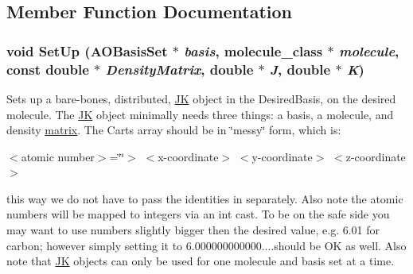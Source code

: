 \subsection{Member Function Documentation}
\hypertarget{classJKBuilder_1_1JK_a13b685265e196c183897777ec2f3136a}{
\subsubsection[{SetUp}]{\setlength{\rightskip}{0pt plus 5cm}void SetUp ({\bf AOBasisSet} $\ast$ {\em basis}, \/  {\bf molecule\_\-class} $\ast$ {\em molecule}, \/  const double $\ast$ {\em DensityMatrix}, \/  double $\ast$ {\em J}, \/  double $\ast$ {\em K})}}
\label{classJKBuilder_1_1JK_a13b685265e196c183897777ec2f3136a}


Sets up a bare-\/bones, distributed, \hyperlink{classJKBuilder_1_1JK}{JK} object in the DesiredBasis, on the desired molecule. The \hyperlink{classJKBuilder_1_1JK}{JK} object minimally needs three things: a basis, a molecule, and density \hyperlink{classJKBuilder_1_1matrix}{matrix}. The Carts array should be in \char`\"{}messy\char`\"{} form, which is:\par
 $<$atomic number$>$=\char`\"{}\char`\"{}$>$ $<$x-\/coordinate$>$ $<$y-\/coordinate$>$ $<$z-\/coordinate$>$\par
 this way we do not have to pass the identities in separately. Also note the atomic numbers will be mapped to integers via an int cast. To be on the safe side you may want to use numbers slightly bigger then the desired value, e.g. 6.01 for carbon; however simply setting it to 6.000000000000....should be OK as well. Also note that \hyperlink{classJKBuilder_1_1JK}{JK} objects can only be used for one molecule and basis set at a time.


